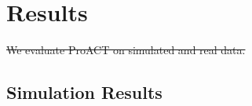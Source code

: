 \documentclass[a4paper,11pt]{article}
\providecommand{\DIFdel}[1]{{\protect\color{red}\sout{#1}}}                      %
\providecommand{\DIFdelbegin}{} %
\providecommand{\DIFdelend}{} %
\begin{document}


\section{Results}
\DIFdelbegin \DIFdel{We evaluate ProACT on simulated and real data. 
}\DIFdelend %


\subsection{Simulation Results}

\end{document}
